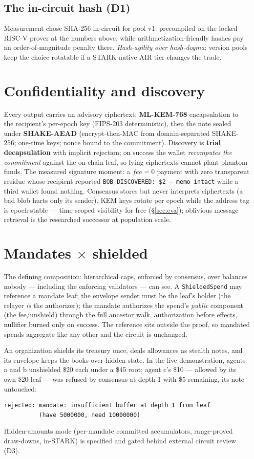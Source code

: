\documentclass[11pt]{article}
\newcommand{\ct}[1]{\texttt{#1}}
\begin{document}
\subsection{The in-circuit hash (D1)}\label{sec:d1}
Measurement chose SHA-256 in-circuit for pool v1: precompiled on the locked RISC-V prover at the numbers above, while arithmetization-friendly hashes pay an order-of-magnitude penalty there. \emph{Hash-agility over hash-dogma}: version pools keep the choice rotatable if a STARK-native AIR tier changes the trade.

\section{Confidentiality and discovery}
Every output carries an advisory ciphertext: \textbf{ML-KEM-768} encapsulation to the recipient's per-epoch key (FIPS-203 deterministic), then the note sealed under \textbf{SHAKE-AEAD} (encrypt-then-MAC from domain-separated SHAKE-256; one-time keys; nonce bound to the commitment). Discovery is \textbf{trial decapsulation} with implicit rejection; on success the wallet \emph{recomputes the commitment} against the on-chain leaf, so lying ciphertexts cannot plant phantom funds. The measured signature moment: a $\mathit{fee}=0$ payment with zero transparent residue whose recipient reported \ct{BOB DISCOVERED: \$2 --- memo intact} while a third wallet found nothing. Consensus stores but never interprets ciphertexts (a bad blob hurts only its sender). KEM keys rotate per epoch while the address tag is epoch-stable --- time-scoped visibility for free (\S\ref{sec:cva}); oblivious message retrieval is the researched successor at population scale.

\section{Mandates $\times$ shielded}\label{sec:mxs}
The defining composition: hierarchical caps, enforced by consensus, over balances nobody --- including the enforcing validators --- can see. A \ct{ShieldedSpend} may reference a mandate leaf; the envelope sender must be the leaf's holder (the relayer \emph{is} the authorizer); the mandate authorizes the spend's \emph{public} component (the fee/unshield) through the full ancestor walk, authorization before effects, nullifier burned only on success. The reference sits outside the proof, so mandated spends aggregate like any other and the circuit is unchanged.

An organization shields its treasury once, deals allowances as stealth notes, and its envelope keeps the books over hidden state. In the live demonstration, agents a and b unshielded \$20 each under a \$45 root; agent c's \$10 --- allowed by its own \$20 leaf --- was refused by consensus at depth 1 with \$5 remaining, its note untouched:
\begin{lstlisting}
rejected: mandate: insufficient buffer at depth 1 from leaf
          (have 5000000, need 10000000)
\end{lstlisting}
Hidden-amounts mode (per-mandate committed accumulators, range-proved draw-downs, in-STARK) is specified and gated behind external circuit review (D3).
\end{document}
